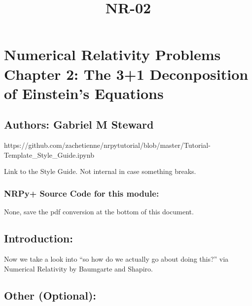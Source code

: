 \documentclass[landscape,letterpaper,10pt,english]{article}
\title{NR-02}
\begin{document}
    
    \maketitle
    
    

    
    \hypertarget{numerical-relativity-problems-chapter-2-the-31-deconposition-of-einsteins-equations}{%
\section{Numerical Relativity Problems Chapter 2: The 3+1 Deconposition
of Einstein's
Equations}\label{numerical-relativity-problems-chapter-2-the-31-deconposition-of-einsteins-equations}}

\hypertarget{authors-gabriel-m-steward}{%
\subsection{Authors: Gabriel M
Steward}\label{authors-gabriel-m-steward}}

    https://github.com/zachetienne/nrpytutorial/blob/master/Tutorial-Template\_Style\_Guide.ipynb

Link to the Style Guide. Not internal in case something breaks.

    \hypertarget{nrpy-source-code-for-this-module}{%
\subsubsection{\texorpdfstring{ NRPy+ Source Code for this
module:}{ NRPy+ Source Code for this module:}}\label{nrpy-source-code-for-this-module}}

None, save the pdf conversion at the bottom of this document.

\hypertarget{introduction}{%
\subsection{Introduction:}\label{introduction}}

Now we take a look into ``so how do we actually go about doing this?''
via Numerical Relativity by Baumgarte and Shapiro.

\hypertarget{other-optional}{%
\subsection{\texorpdfstring{ Other
(Optional):}{ Other (Optional):}}\label{other-optional}}
\end{document}
